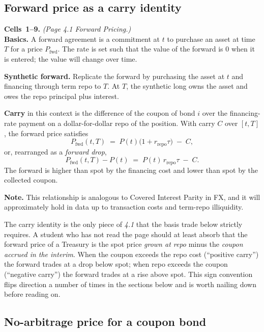 \subsection{Forward price as a carry identity}\label{L4-sec:fwd-carry}

\begin{keyblock}
\textbf{Cells~1--9.} \emph{(Page 4.1 \textperiodcentered{} Forward Pricing.)}\\
\textbf{Basics.} A forward agreement is a commitment at $t$ to purchase an
asset at time $T$ for a price $P_{\text{fwd}}$. The rate is set such that
the value of the forward is $0$ when it is entered; the value will change
over time.

\textbf{Synthetic forward.} Replicate the forward by purchasing the asset
at $t$ and financing through term repo to $T$. At $T$, the synthetic long
owns the asset and owes the repo principal plus interest.

\textbf{Carry} in this context is the difference of the coupon of bond $i$
over the financing-rate payment on a dollar-for-dollar repo of the
position. With carry $C$ over $[t,T]$, the forward price satisfies
\[
  P_{\text{fwd}}(t,T)
    \;=\; P(t)\bigl(1 + r_{\text{repo}}\tau\bigr) \;-\; C,
\]
or, rearranged as a \emph{forward drop},
\[
  P_{\text{fwd}}(t,T) - P(t) \;=\; P(t)\,r_{\text{repo}}\tau \;-\; C.
\]
The forward is higher than spot by the financing cost and lower than spot
by the collected coupon.

\textbf{Note.} This relationship is analogous to Covered Interest Parity in
FX, and it will approximately hold in data up to transaction costs and
term-repo illiquidity.
\end{keyblock}

The carry identity is the only piece of \emph{4.1} that the basis trade
below strictly requires. A student who has not read the page should at least
absorb that the forward price of a Treasury is the spot price \emph{grown at
repo} minus the \emph{coupon accrued in the interim}. When the coupon exceeds
the repo cost (``positive carry'') the forward trades at a drop below spot;
when repo exceeds the coupon (``negative carry'') the forward trades at a
rise above spot. This sign convention flips direction a number of times in
the sections below and is worth nailing down before reading on.

\subsection{No-arbitrage price for a coupon bond}\label{L4-sec:fwd-price}

